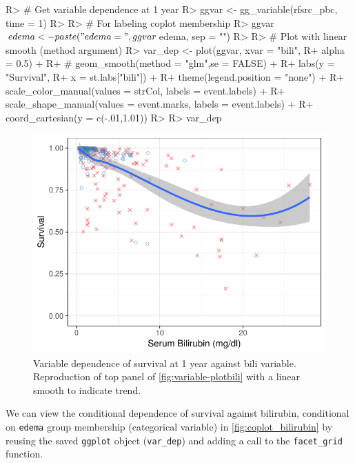 \documentclass[article, nojss]{jss}
\begin{document}
\begin{Schunk}
\begin{Sinput}
R> # Get variable dependence at 1 year
R> ggvar <- gg_variable(rfsrc_pbc, time = 1)
R>
R> # For labeling coplot membership
R> ggvar$edema <- paste("edema = ", ggvar$edema, sep = "")
R>
R> # Plot with linear smooth (method argument)
R> var_dep <- plot(ggvar, xvar = "bili",
R+                 alpha = 0.5) +
R+ #  geom_smooth(method = "glm",se = FALSE) +
R+   labs(y = "Survival",
R+        x = st.labs["bili"]) +
R+   theme(legend.position = "none") +
R+   scale_color_manual(values = strCol, labels = event.labels) +
R+   scale_shape_manual(values = event.marks, labels = event.labels) +
R+   coord_cartesian(y = c(-.01,1.01))
R>
R> var_dep
\end{Sinput}
\begin{figure}[!htb]

{\centering \includegraphics{rfs-var_dep-1}

}

\caption{Variable dependence of survival at 1 year against bili variable. Reproduction of top panel of \autoref{fig:variable-plotbili} with a linear smooth to indicate trend.}\label{fig:var_dep}
\end{figure}
\end{Schunk}

We can view the conditional dependence of survival against bilirubin,
conditional on \texttt{edema} group membership (categorical variable) in
\autoref{fig:coplot_bilirubin} by reusing the saved \texttt{ggplot}
object (\texttt{var\_dep}) and adding a call to the \texttt{facet\_grid}
function.
\end{document}
